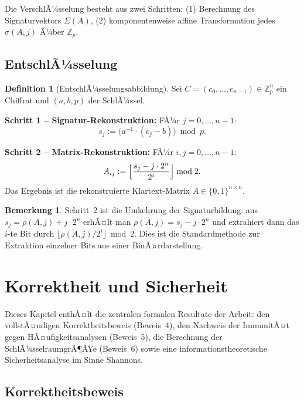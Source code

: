 ﻿\documentclass[a4paper,12pt]{scrreprt}
\theoremstyle{definition}
\newtheorem{definition}{Definition}[section]
\newtheorem{bemerkung}{Bemerkung}[section]
\begin{document}
Die VerschlÃ¼sselung besteht aus zwei Schritten: (1) Berechnung des Signaturvektors $\Sigma(A)$, (2) komponentenweise affine Transformation jedes $\sigma(A,j)$ Ã¼ber $\mathbb{Z}_p$.

\subsection{EntschlÃ¼sselung}

\begin{definition}[EntschlÃ¼sselungsabbildung]
	\label{def:dec}
	Sei $C = (c_0, \ldots, c_{n-1}) \in \mathbb{Z}_p^n$ ein Chiffrat und $(a, b, p)$ der SchlÃ¼ssel.
	
	\textbf{Schritt 1 -- Signatur-Rekonstruktion:} FÃ¼r $j = 0, \ldots, n-1$:
	\[
	s_j := \bigl(a^{-1} \cdot (c_j - b)\bigr) \bmod p.
	\]
	
	\textbf{Schritt 2 -- Matrix-Rekonstruktion:} FÃ¼r $i, j = 0, \ldots, n-1$:
	\[
	A_{ij} := \Bigl\lfloor \frac{s_j - j \cdot 2^n}{2^i} \Bigr\rfloor \bmod 2.
	\]
	Das Ergebnis ist die rekonstruierte Klartext-Matrix $A \in \{0,1\}^{n \times n}$.
\end{definition}

\begin{bemerkung}
	Schritt~2 ist die Umkehrung der Signaturbildung: aus $s_j = \rho(A,j) + j \cdot 2^n$ erhÃ¤lt man $\rho(A,j) = s_j - j \cdot 2^n$ und extrahiert dann das $i$-te Bit durch $\lfloor \rho(A,j) / 2^i \rfloor \bmod 2$. Dies ist die Standardmethode zur Extraktion einzelner Bits aus einer BinÃ¤rdarstellung.
\end{bemerkung}

\section{Korrektheit und Sicherheit}

Dieses Kapitel enthÃ¤lt die zentralen formalen Resultate der Arbeit: den vollstÃ¤ndigen Korrektheitsbeweis (Beweis~4), den Nachweis der ImmunitÃ¤t gegen HÃ¤ufigkeitsanalysen (Beweis~5), die Berechnung der SchlÃ¼sselraumgrÃ¶ÃŸe (Beweis~6) sowie eine informationstheoretische Sicherheitsanalyse im Sinne Shannons.

\subsection{Korrektheitsbeweis}
\end{document}
